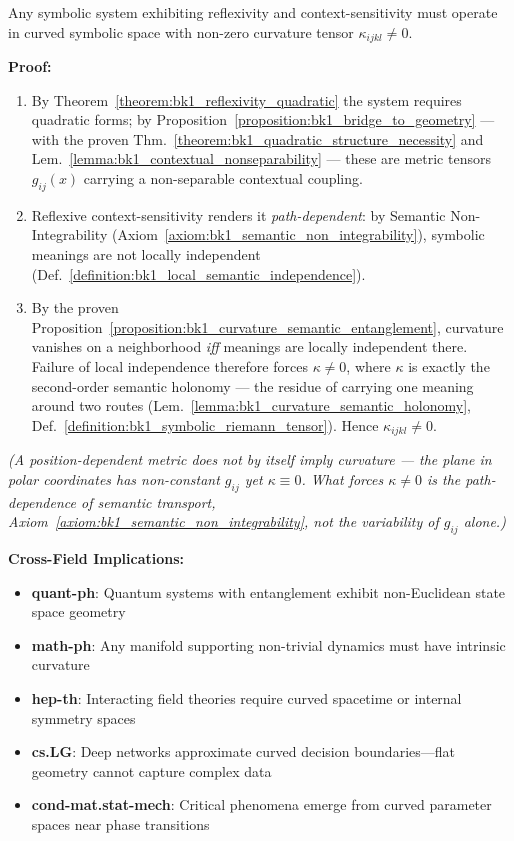 \begin{corollary}
\label{corollary:bk1_non_euclidean_necessity}
Any symbolic system exhibiting reflexivity and context-sensitivity must operate in curved symbolic space with non-zero curvature tensor $\kappa_{ijkl} \neq 0$.

\textbf{Proof:}
\begin{enumerate}
\item By Theorem~\ref{theorem:bk1_reflexivity_quadratic} the system requires quadratic forms; by Proposition~\ref{proposition:bk1_bridge_to_geometry} --- with the proven Thm.~\ref{theorem:bk1_quadratic_structure_necessity} and Lem.~\ref{lemma:bk1_contextual_nonseparability} --- these are metric tensors $g_{ij}(x)$ carrying a non-separable contextual coupling.
\item Reflexive context-sensitivity renders it \emph{path-dependent}: by Semantic Non-Integrability (Axiom~\ref{axiom:bk1_semantic_non_integrability}), symbolic meanings are not locally independent (Def.~\ref{definition:bk1_local_semantic_independence}).
\item By the proven Proposition~\ref{proposition:bk1_curvature_semantic_entanglement}, curvature vanishes on a neighborhood \emph{iff} meanings are locally independent there. Failure of local independence therefore forces $\kappa \neq 0$, where $\kappa$ is exactly the second-order semantic holonomy --- the residue of carrying one meaning around two routes (Lem.~\ref{lemma:bk1_curvature_semantic_holonomy}, Def.~\ref{definition:bk1_symbolic_riemann_tensor}). Hence $\kappa_{ijkl} \neq 0$.
\end{enumerate}
\noindent\emph{(A position-dependent metric does not by itself imply curvature --- the plane in polar coordinates has non-constant $g_{ij}$ yet $\kappa \equiv 0$. What forces $\kappa \neq 0$ is the path-dependence of semantic transport, Axiom~\ref{axiom:bk1_semantic_non_integrability}, not the variability of $g_{ij}$ alone.)}

\textbf{Cross-Field Implications:}
\begin{itemize}
\item \textbf{quant-ph}: Quantum systems with entanglement exhibit non-Euclidean state space geometry
\item \textbf{math-ph}: Any manifold supporting non-trivial dynamics must have intrinsic curvature
\item \textbf{hep-th}: Interacting field theories require curved spacetime or internal symmetry spaces
\item \textbf{cs.LG}: Deep networks approximate curved decision boundaries—flat geometry cannot capture complex data
\item \textbf{cond-mat.stat-mech}: Critical phenomena emerge from curved parameter spaces near phase transitions
\end{itemize}
\end{corollary}

